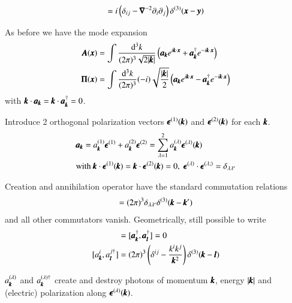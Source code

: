 \begin{align}
	[A_i(\pmb{x}), \Pi_j(\pmb{y})] = i \left( \delta_{ij} - \vecnab^{-2}\partial_i \partial_j \right) \delta^{(3)} (\pmb{x} - \pmb{y})
\end{align}

As before we have the mode expansion
\begin{align*}
	\pmb{A}(\pmb{x}) &= \int \frac{\dd^3 k}{(2\pi)^3\sqrt{2|\pmb{k}|}} \left( \pmb{a}_{\pmb{k}}e^{i\pmb{k}\cdot\pmb{x}} + \pmb{a}^\dagger_{\pmb{k}} e^{-i\pmb{k}\cdot\pmb{x}} \right) \\
	\pmb{\Pi}(\pmb{x}) &= \int \frac{\dd^3 k}{(2\pi)^3} (-i)\sqrt{\frac{|\pmb{k}|}{2}}\left( \pmb{a}_{\pmb{k}}e^{i\pmb{k}\cdot\pmb{x}} - \pmb{a}^\dagger_{\pmb{k}} e^{-i\pmb{k}\cdot\pmb{x}} \right) \\
\end{align*}
with $\pmb{k}\cdot\pmb{a}_{\pmb{k}} = \pmb{k}\cdot\pmb{a}^\dagger_{\pmb{k}} = 0$.

Introduce 2 orthogonal polarization vectors $\pmb{\epsilon}^{(1)}(\pmb{k})$ and $\pmb{\epsilon}^{(2)}(\pmb{k})$ for each $\pmb{k}$.
\begin{align*}
	&\pmb{a}_{\pmb{k}} = a_{\pmb{k}}^{(1)}\pmb{\epsilon}^{(1)} + a_{\pmb{k}}^{(2)}\pmb{\epsilon}^{(2)} = \sum_{\lambda=1}^2 a_{\pmb{k}}^{(\lambda)}\pmb{\epsilon}^{(\lambda)}(\pmb{k}) \\
	& \text{with } \pmb{k}\cdot\pmb{\epsilon}^{(1)}(\pmb{k}) = \pmb{k}\cdot\pmb{\epsilon}^{(2)}(\pmb{k}) = 0,\; \pmb{\epsilon}^{(\lambda)}\cdot \pmb{\epsilon}^{(\lambda;)}=\delta_{\lambda \lambda'}
\end{align*}

Creation and annihilation operator have the standard commutation relations
\begin{align}
	[a_{\veck}^{(\lambda)}, a_{\veck'}^{(\lambda')\dagger}] = (2\pi)^3 \delta_{\lambda\lambda'}\delta^{(3)}(\veck-\veck')
\end{align} 
and all other commutators vanish. Geometrically, still possible to write
\begin{align*}
	[\pmb{a}_{\veck}, \pmb{a}_{\pmb{l}}] &= 	[\pmb{a}_{\veck}^\dagger, \pmb{a}_{\pmb{l}}^\dagger] = 0 \\
	[a^i_{\veck}, a_{\pmb{l}}^{j\dagger}] &= (2\pi)^3 \left( \delta^{ij} - \frac{k^i k^j}{\veck^2} \right) \delta^{(3)}(\veck-\pmb{l})
\end{align*}

$a_{\pmb{k}}^{(\lambda)}$ and $a_{\pmb{k}}^{(\lambda)\dagger}$ create and destroy photons of momentum $\pmb{k}$, energy $|\pmb{k}|$ and (electric) polarization along $\pmb{\epsilon}^{(\lambda)}(\pmb{k})$. 

